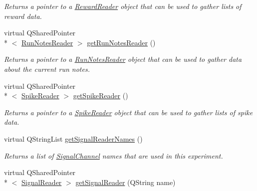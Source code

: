 \begin{DoxyCompactItemize}
\begin{DoxyCompactList}\small\item\em Returns a pointer to a \hyperlink{class_picto_1_1_reward_reader}{Reward\-Reader} object that can be used to gather lists of reward data. \end{DoxyCompactList}\item 
\hypertarget{class_picto_1_1_playback_state_updater_afdca78426469d3273516ca488f511199}{virtual Q\-Shared\-Pointer\\*
$<$ \hyperlink{class_picto_1_1_run_notes_reader}{Run\-Notes\-Reader} $>$ \hyperlink{class_picto_1_1_playback_state_updater_afdca78426469d3273516ca488f511199}{get\-Run\-Notes\-Reader} ()}\label{class_picto_1_1_playback_state_updater_afdca78426469d3273516ca488f511199}

\begin{DoxyCompactList}\small\item\em Returns a pointer to a \hyperlink{class_picto_1_1_run_notes_reader}{Run\-Notes\-Reader} object that can be used to gather data about the current run notes. \end{DoxyCompactList}\item 
\hypertarget{class_picto_1_1_playback_state_updater_ad9d4707cfea6d9027dc866290fa85015}{virtual Q\-Shared\-Pointer\\*
$<$ \hyperlink{class_picto_1_1_spike_reader}{Spike\-Reader} $>$ \hyperlink{class_picto_1_1_playback_state_updater_ad9d4707cfea6d9027dc866290fa85015}{get\-Spike\-Reader} ()}\label{class_picto_1_1_playback_state_updater_ad9d4707cfea6d9027dc866290fa85015}

\begin{DoxyCompactList}\small\item\em Returns a pointer to a \hyperlink{class_picto_1_1_spike_reader}{Spike\-Reader} object that can be used to gather lists of spike data. \end{DoxyCompactList}\item 
\hypertarget{class_picto_1_1_playback_state_updater_a41d8a602e8383b06db69a05b45673ef9}{virtual Q\-String\-List \hyperlink{class_picto_1_1_playback_state_updater_a41d8a602e8383b06db69a05b45673ef9}{get\-Signal\-Reader\-Names} ()}\label{class_picto_1_1_playback_state_updater_a41d8a602e8383b06db69a05b45673ef9}

\begin{DoxyCompactList}\small\item\em Returns a list of \hyperlink{class_picto_1_1_signal_channel}{Signal\-Channel} names that are used in this experiment. \end{DoxyCompactList}\item 
\hypertarget{class_picto_1_1_playback_state_updater_a2c28c2e636e1ec2705e2d9748935e361}{virtual Q\-Shared\-Pointer\\*
$<$ \hyperlink{class_picto_1_1_signal_reader}{Signal\-Reader} $>$ \hyperlink{class_picto_1_1_playback_state_updater_a2c28c2e636e1ec2705e2d9748935e361}{get\-Signal\-Reader} (Q\-String name)}\label{class_picto_1_1_playback_state_updater_a2c28c2e636e1ec2705e2d9748935e361}


\end{DoxyCompactItemize}
